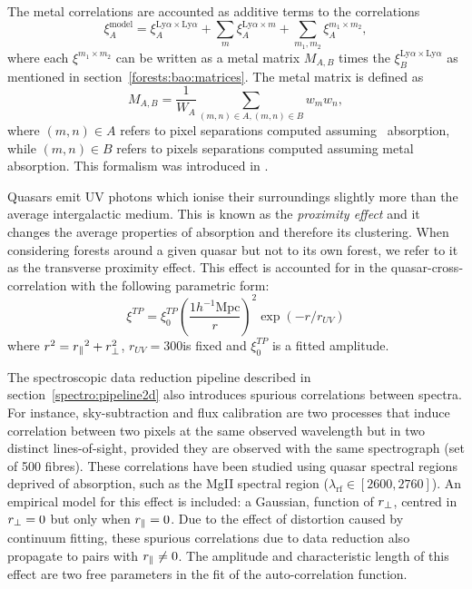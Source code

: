 The metal correlations are accounted as additive terms to the \lya 
correlations
\begin{equation}
\xi^\mathrm{model}_A =    \xi^{\mathrm{Ly}\alpha \times \mathrm{Ly}\alpha  }_A 
    + \sum_m \xi^{\mathrm{Ly}\alpha  \times m}_A
    + \sum_{m_1, m_2} \xi^{m_1 \times m_2}_A,
\end{equation}
where each $\xi^{m_1 \times m_2}$ can be written as a metal matrix 
$M_{A,B}$ times the $\xi^{\mathrm{Ly}\alpha \times \mathrm{Ly}\alpha  }_B$ 
as mentioned in section~\ref{forests:bao:matrices}. The metal matrix is 
defined as 
\begin{equation}
M_{A,B} = \frac{1}{W_A}  \sum_{(m,n)\in A, (m, n)\in B} w_m w_n, 
\end{equation}
where $(m, n)\in A$ refers to pixel separations computed assuming 
\lya\ absorption, while $(m, n)\in B$ refers to pixels separations  
computed assuming metal absorption. This formalism was introduced 
in \cite{blomqvistTriplyionizedCarbonForest2018}. 

Quasars emit UV photons which ionise their surroundings slightly 
more than the average intergalactic medium. This is known as the 
\emph{proximity effect} and it changes the average properties of 
\lya absorption and therefore its clustering. When considering 
forests around a given quasar but not to its own forest, we refer 
to it as the transverse proximity effect. This effect is accounted  
for in the quasar-\lya cross-correlation with the following parametric
form:
\begin{equation}
\xi^{TP} = \xi_0^{TP} \left( \frac{1 h^{-1} \mathrm{Mpc}}{r} \right)^2 \exp \left( - r /r_{UV} \right)
\end{equation}
where $r^2 = {r_\parallel}^2 + r^2_\perp$, $r_{UV} = 300$\hmpc is fixed and $\xi_0^{TP}$ 
is a fitted amplitude. 

The spectroscopic data reduction pipeline described in section~\ref{spectro:pipeline2d}
also introduces spurious correlations between spectra. 
For instance, sky-subtraction and flux calibration are two processes 
that induce correlation between two pixels at the same observed wavelength 
but in two distinct lines-of-sight, provided they are observed with the 
same spectrograph (set of 500 fibres). These correlations have been 
studied using quasar spectral regions deprived of \lya absorption,
such as the MgII spectral region ($\lambda_\mathrm{rf} \in [2600, 2760]$\angstrom).
An empirical model for this effect is included: a Gaussian, function of ${r_\perp}$, centred in ${r_\perp} = 0$ 
but only when ${r_\parallel} = 0$. 
Due to the effect of distortion caused by continuum fitting, these spurious
correlations due to data reduction also propagate to pairs with ${r_\parallel} \neq 0$.  
The amplitude and characteristic length of this effect are two free parameters
in the fit of the \lya auto-correlation function.

